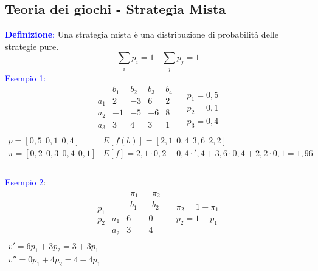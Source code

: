 \documentclass[12pt,a4paper]{article}
\begin{document}
\subsection{Teoria dei giochi - Strategia Mista}
\textcolor{blue}{\textbf{Definizione}:} Una strategia mista è una distribuzione di probabilità delle strategie pure.
$$\sum_i p_i = 1 \ \ \ \ \sum_j p_j = 1$$
\textcolor{blue}{Esempio 1:}
$$\begin{array}{c|cccc}
& b_1& b_2 & b_3 & b_4\\ \hline
a_1 & 2 & -3 & 6 & 2\\
a_2 & -1 & -5 & -6 & 8\\
a_3 & 3 & 4 & 3 & 1\\
\end{array}\ \ \ \ \begin{array}{c}p_1=0,5\\p_2=0,1\\p_3=0,4\end{array}$$
$\begin{array}{ll}
p = [0,5 \ \ 0,1 \ \ 0,4]  & E[f(b)]=[2,1 \ \ 0,4 \ \ 3,6 \ \ 2,2]\\
\pi = [ 0,2 \ \ 0,3 \ \ 0,4 \ \ 0,1] & E[f]=2,1 \cdot 0,2 - 0,4 \cdot ',4 + 3,6 \cdot 0,4 + 2,2 \cdot 0,1 = 1,96\\
\end{array}$\\
\\
\textcolor{blue}{Esempio 2}:
$$
 \begin{array}{c}
 \\
 \\
 p_1\\
 p_2\\
 \end{array}\begin{array}{c|cc}
 & \begin{array}{c}\pi_1\\b_1\end{array} & \begin{array}{c}\pi_2\\b_2\end{array}\\ \hline
 a_1 & 6 & 0\\
 a_2 & 3 & 4\\
 \end{array} \ \ \ \begin{array}{c}\pi_2 = 1 - \pi_1\\p_2=1-p_1\end{array}$$
 $\begin{array}{c}
 v'=6p_1+3p_2 = 3 + 3p_1\\
 v''=0p_1+4p_2 = 4-4p_1
 \end{array}$
\end{document}
